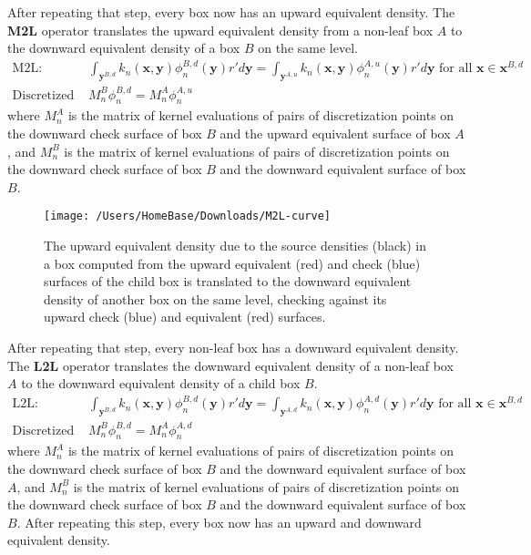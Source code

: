 \documentclass[12pt,letterpaper]{article}
\begin{document}
After repeating that step, every box now has an upward equivalent density. The \textbf{M2L} operator translates the upward equivalent density from a non-leaf box $A$ to the downward equivalent density of a box $B$ on the same level.
\begin{align}
\mbox{M2L: }&\int_{\mathbf{y}^{B,d}}{k_n(\mathbf{x},\mathbf{y})}\phi^{B,d}_n{(\mathbf{y})}r'd\mathbf{y} = \int_{\mathbf{y}^{A,u}}{k_n(\mathbf{x},\mathbf{y})}\phi^{A,u}_n{(\mathbf{y})}r'd\mathbf{y}\mbox{ for all }\mathbf{x}\in\mathbf{x}^{B,d}\\
\mbox{Discretized M2L: }&M_n^B\phi^{B,d}_n=M_n^A\phi^{A,u}_n
\end{align}
where $M_n^A$ is the matrix of kernel evaluations of pairs of discretization points on the downward check surface of box $B$ and the upward equivalent surface of box $A$, and $M_n^B$ is the matrix of kernel evaluations of pairs of discretization points on the downward check surface of box $B$ and the downward equivalent surface of box $B$.

\begin{figure}[!ht]
\begin{center}
\texttt{[image: /Users/HomeBase/Downloads/M2L-curve]}
\end{center}
\caption{The upward equivalent density due to the source densities (black) in a box computed from the upward equivalent (red) and check (blue) surfaces of the child box is translated to the downward equivalent density of another box on the same level, checking against its upward check (blue) and equivalent (red) surfaces.}
\end{figure}

After repeating that step, every non-leaf box has a downward equivalent density. The \textbf{L2L} operator translates the downward equivalent density of a non-leaf box $A$ to the downward equivalent density of a child box $B$.
\begin{align}
\mbox{L2L: }&\int_{\mathbf{y}^{B,d}}{k_n(\mathbf{x},\mathbf{y})}\phi^{B,d}_n{(\mathbf{y})}r'd\mathbf{y}=\int_{\mathbf{y}^{A,d}}{k_n(\mathbf{x},\mathbf{y})}\phi^{A,d}_n{(\mathbf{y})}r'd\mathbf{y}\mbox{ for all }\mathbf{x}\in\mathbf{x}^{B,d}\\
\mbox{Discretized L2L: }&M_n^B\phi^{B,d}_n=M_n^A\phi^{A,d}_n
\end{align}
where $M_n^A$ is the matrix of kernel evaluations of pairs of discretization points on the downward check surface of box $B$ and the downward equivalent surface of box $A$, and $M_n^B$ is the matrix of kernel evaluations of pairs of discretization points on the downward check surface of box $B$ and the downward equivalent surface of box $B$. After repeating this step, every box now has an upward and downward equivalent density.
\end{document}
